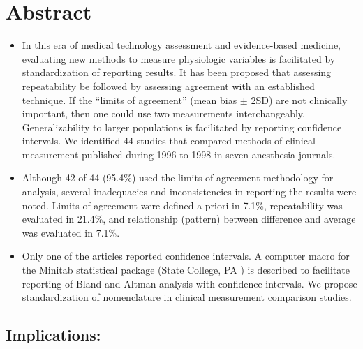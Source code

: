 \documentclass[MAIN.tex]{subfiles}
\begin{document}
	\section{Abstract}
	\begin{itemize}
		\item In this era of medical technology assessment and evidence-based medicine, evaluating new methods to measure physiologic variables is facilitated by standardization of reporting results. It has been proposed that assessing repeatability be followed by assessing agreement with an established technique. If the “limits of agreement” (mean bias $\pm$ 2SD) are not clinically important, then one could use two measurements interchangeably. Generalizability to larger populations is facilitated by reporting confidence intervals. We identified 44 studies that compared methods of clinical measurement published during 1996 to 1998 in seven anesthesia journals. 
		
		\item Although 42 of 44 (95.4\%) used the limits of agreement methodology for analysis, several inadequacies and inconsistencies in reporting the results were noted. Limits of agreement were defined a priori in 7.1\%, repeatability was evaluated in 21.4\%, and relationship (pattern) between difference and average was evaluated in 7.1\%. 
		\item Only one of the articles reported confidence intervals. A computer macro for the Minitab statistical package (State College, PA ) is described to facilitate reporting of Bland and Altman analysis with confidence intervals. We propose standardization of nomenclature in clinical measurement comparison studies.
		
	\end{itemize}
	\subsection*{Implications: }
	
\end{document}
